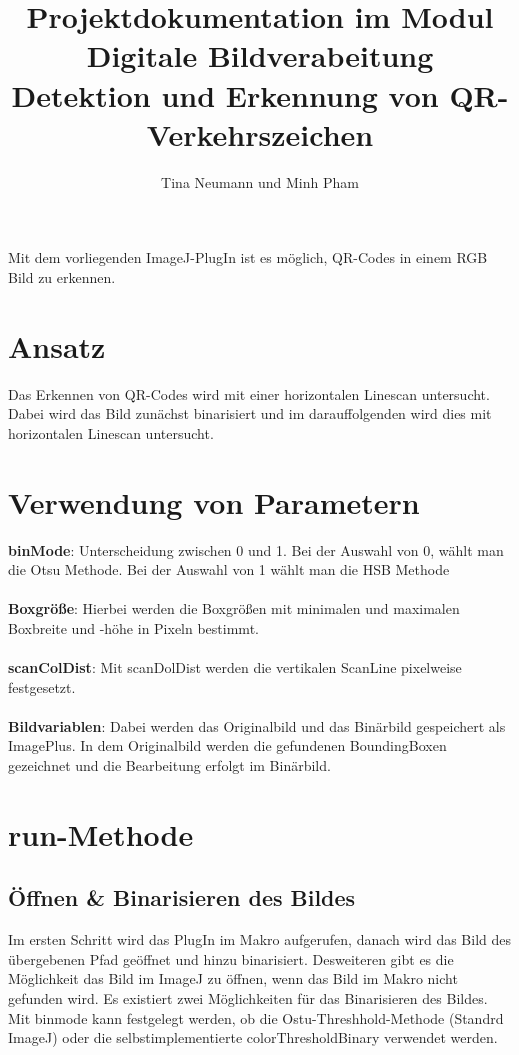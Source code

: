 \documentclass[a4paper,11pt,parskip]{article}
\begin{document}
\title{Projektdokumentation im Modul Digitale Bildverabeitung\\  
\textbf{Detektion und Erkennung von QR-Verkehrszeichen}}
\author{Tina Neumann und Minh Pham}

\maketitle

Mit dem vorliegenden ImageJ-PlugIn ist es möglich, QR-Codes in einem RGB Bild zu erkennen.\\

\section{Ansatz}
Das Erkennen von QR-Codes wird mit einer horizontalen Linescan untersucht. Dabei wird das Bild zunächst binarisiert und im darauffolgenden wird dies mit horizontalen Linescan untersucht.

\section{Verwendung von Parametern}
\textbf{binMode}: Unterscheidung zwischen 0 und 1. Bei der Auswahl von 0, wählt man die Otsu Methode. Bei der Auswahl von 1 wählt man die HSB Methode\\ \\
\textbf{Boxgröße}: Hierbei werden die Boxgrößen mit minimalen und maximalen Boxbreite und -höhe in Pixeln bestimmt.\\ \\
\textbf{scanColDist}: Mit scanDolDist werden die vertikalen ScanLine pixelweise festgesetzt.\\ \\
\textbf{Bildvariablen}: Dabei werden das Originalbild und das Binärbild gespeichert als ImagePlus. In dem Originalbild werden die gefundenen BoundingBoxen gezeichnet und die Bearbeitung erfolgt im Binärbild.

\section{run-Methode}

\subsection{Öffnen \& Binarisieren des Bildes}
Im ersten Schritt wird das PlugIn im Makro aufgerufen, danach wird das Bild des übergebenen Pfad geöffnet und hinzu binarisiert. Desweiteren gibt es die Möglichkeit das Bild im ImageJ zu öffnen, wenn das Bild im Makro nicht gefunden wird.
Es existiert zwei Möglichkeiten für das Binarisieren des Bildes. Mit binmode kann festgelegt werden, ob die Ostu-Threshhold-Methode (Standrd ImageJ) oder die selbstimplementierte colorThresholdBinary verwendet werden.
\end{document}
